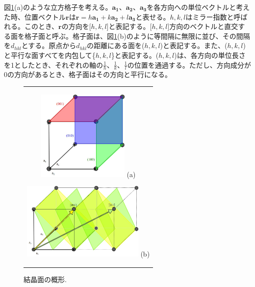 \documentclass[11pt,a4j,uplatex]{jsarticle}
\begin{document}
図\ref{a1}(a)のような立方格子を考える。$\bm{a_1}、\bm{a_2}、\bm{a_3}$を各方向への単位ベクトルと考えた時、位置ベクトル$\bm{r}$は$\bm{r}=h\bm{a_1}+k\bm{a_2}+l\bm{a_3}$と表せる。$h,k,l$はミラー指数と呼ばれる。このとき、$\bm{r}$の方向を[$h,k,l$]と表記する。[$h,k,l$]方向のベクトルと直交する面を格子面と呼ぶ。格子面は、図\ref{a1}(b)のように等間隔に無限に並び、その間隔を$d_{hkl}$とする。原点から$d_{hkl}$の距離にある面を($h,k,l$)と表記する。また、($h,k,l$)と平行な面すべてを内包して\{$h,k,l$\}と表記する。($h,k,l$)は、各方向の単位長さを1としたとき、それぞれの軸の$\frac{1}{h}$、$\frac{1}{k}$、$\frac{1}{l}$の位置を通過する。ただし、方向成分が0の方向があるとき、格子面はその方向と平行になる。
\begin{figure}[ht]
 \centering
 \begin{tabular}{c}

  \begin{minipage}{0.5\hsize}
   \centering
   \includegraphics[clip, width=4.5cm]{a1.jpg}
   \hspace{2cm} (a)
  \end{minipage}

  \begin{minipage}{0.5\hsize}
   \centering
   \includegraphics[clip, width=6cm]{a2.jpg}
   \hspace{2cm} (b)
  \end{minipage}

 \end{tabular}
 \caption{結晶面の概形.}
 \label{a1}

\end{figure}
\end{document}
